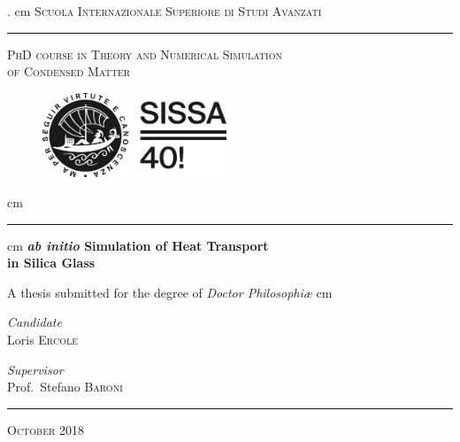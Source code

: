 \begin{titlepage}
\begin{center}

  . cm
\textsc{\Large Scuola Internazionale Superiore di Studi Avanzati} %
\vskip 0.75cm
\hrule height 1 pt
\vskip 0.75cm
\textsc{\fontsize{14}{16}\selectfont PhD course in Theory and Numerical Simulation\\
of Condensed Matter}
\vskip 0.5cm

 \begin{figure}[h]
 \centering
 \includegraphics[width=5.5cm]{frontmatter/SISSA_40_alt.png}
 \end{figure}

 cm
\hrule height 1 pt
 cm
{ \fontsize{20}{22} \bfseries  \emph{ab initio} Simulation of Heat Transport \\
\vspace{0.4cm}
in Silica Glass
}
\vfill

{A thesis submitted for the degree of \textit{Doctor Philosophi\ae}}
 cm

\begin{center}
\begin{minipage}{0.3\textwidth}
\fontsize{12}{14}\selectfont
\emph{Candidate}\\
\smallskip
Loris \textsc{Ercole}
\end{minipage}
\hspace{2cm}
\begin{minipage}{0.3\textwidth}
\fontsize{12}{14}\selectfont
\emph{Supervisor}\\
\smallskip
Prof.~Stefano \textsc{Baroni}
\end{minipage}
\end{center}
\vspace{1cm}



\hrule height 1 pt
\vskip 0.5cm

\textsc{\large October 2018}

\end{center}

\end{titlepage} 